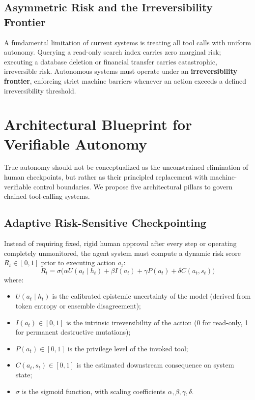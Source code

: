 \documentclass[conference]{IEEEtran}
\begin{document}
\subsection{Asymmetric Risk and the Irreversibility Frontier}
A fundamental limitation of current systems is treating all tool calls with uniform autonomy. Querying a read-only search index carries zero marginal risk; executing a database deletion or financial transfer carries catastrophic, irreversible risk. Autonomous systems must operate under an \textbf{irreversibility frontier}, enforcing strict machine barriers whenever an action exceeds a defined irreversibility threshold.

\section{Architectural Blueprint for Verifiable Autonomy}
True autonomy should not be conceptualized as the unconstrained elimination of human checkpoints, but rather as their principled replacement with machine-verifiable control boundaries. We propose five architectural pillars to govern chained tool-calling systems.

\subsection{Adaptive Risk-Sensitive Checkpointing}
Instead of requiring fixed, rigid human approval after every step or operating completely unmonitored, the agent system must compute a dynamic risk score $R_t \in [0, 1]$ prior to executing action $a_t$:
\begin{equation}
R_t = \sigma\Big(\alpha U(a_t \mid h_t) + \beta I(a_t) + \gamma P(a_t) + \delta C(a_t, s_t)\Big)
\label{eq:risk_score}
\end{equation}
where:
\begin{itemize}
    \item $U(a_t \mid h_t)$ is the calibrated epistemic uncertainty of the model (derived from token entropy or ensemble disagreement);
    \item $I(a_t) \in [0, 1]$ is the intrinsic irreversibility of the action (0 for read-only, 1 for permanent destructive mutations);
    \item $P(a_t) \in [0, 1]$ is the privilege level of the invoked tool;
    \item $C(a_t, s_t) \in [0, 1]$ is the estimated downstream consequence on system state;
    \item $\sigma$ is the sigmoid function, with scaling coefficients $\alpha, \beta, \gamma, \delta$.
\end{itemize}
\end{document}

